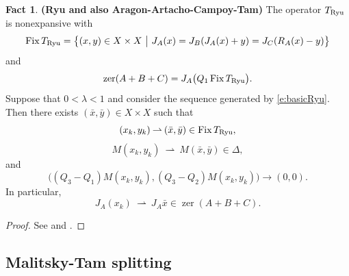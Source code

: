 \documentclass[11pt]{article}
\newcommand{\weakly}{\ensuremath{\:{\rightharpoonup}\:}}
\newcommand{\menge}[2]{\big\{{#1}~\big |~{#2}\big\}}
\newcommand{\zer}{\ensuremath{\operatorname{zer}}}
\newcommand{\Fix}{\ensuremath{\operatorname{Fix}}}
\newcommand{\tryu}{\ensuremath{T_{\text{\scriptsize Ryu}}}}
\theoremstyle{definition}
\newtheorem{fact}[theorem]{Fact}
\providecommand{\zer}{\operatorname{zer}}
\begin{document}
{\begin{fact} {\bf (Ryu and also Aragon-Artacho-Campoy-Tam)}
\label{f:Ryu}
The operator
$\tryu$ is nonexpansive with 
\begin{equation}
\label{e:fixtryu}
\Fix \tryu = 
\menge{(x,y)\in X\times X}{J_A(x)=J_B(J_A(x)+y) = J_C(R_A(x)-y)}
\end{equation}
and 
\begin{equation*}
\zer(A+B+C) = J_A\big(Q_1\Fix\tryu\big). 
\end{equation*}
Suppose that $0<\lambda<1$ and 
consider the sequence generated by 
\cref{e:basicRyu}. 
Then there exists $(\bar{x},\bar{y})\in X\times X$ such that 
\begin{equation*}
(x_k,y_k)\weakly (\bar{x},\bar{y}) \in \Fix\tryu, 
\end{equation*}
\begin{equation*}
M(x_k,y_k) \weakly M(\bar{x},\bar{y})\in\Delta, 
\end{equation*}
and 
\begin{equation}
\label{e:210815d}
\big((Q_3-Q_1)M(x_k,y_k),(Q_3-Q_2)M(x_k,y_k)\big)\to (0,0). 
\end{equation}
In particular,
\begin{equation*}
J_A(x_k) \weakly J_A\bar{x}\in \zer(A+B+C).
\end{equation*}
\end{fact}
\begin{proof}
See \cite{Ryu} and \cite{AACT20}. 
\end{proof}


\subsection{Malitsky-Tam splitting}

}
\end{document}
